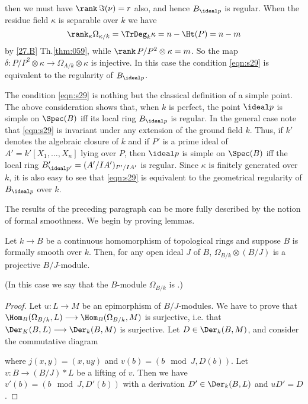 \documentclass[../main]{subfiles}
\begin{document}
then we must have $\rank \, \Im(\nu) = r$ also, and hence $B_{\ideal p}$ is regular. When the residue field $\kappa$ is separable over $k$ we have 
\[
\rank_\kappa \Omega_{\kappa/k} = \TrDeg_k \kappa = n - \Ht(P) = n - m
\]
by \ref{27.B} Th.\ref{thm:059}, while $\rank \, P/P^2 \otimes \kappa = m$. So the map $\delta : P/P^2 \otimes \kappa \longrightarrow \Omega_{A/k} \otimes \kappa$ is injective. In this case the condition \eqref{eqn:s29} is equivalent to the regularity of $B_{\ideal p}$. 

The condition \eqref{eqn:s29} is nothing but the classical definition of a simple point. The above consideration shows that, when $k$ is perfect, the point $\ideal p$ is simple on $\Spec(B)$ iff its local ring $B_{\ideal p}$ is regular. In the general case note that \eqref{eqn:s29} is invariant under any extension of the ground field $k$. Thus, if $k'$ denotes the algebraic closure of $k$ and if $P'$ is a prime ideal of $A' = k'[X_1, \ldots, X_n]$ lying over $P$, then $\ideal p$ is simple on $\Spec(B)$ iff the local ring $B'_{\ideal p'} = (A'/IA')_{P'/IA'}$ is regular. Since $\kappa$ is finitely generated over $k$, it is also easy to see that \eqref{eqn:s29} is equivalent to the geometrical regularity of $B_{\ideal p}$ over $k$. 

\newparagraph The results of the preceding paragraph can be more fully described by the notion of formal smoothness. We begin by proving lemmas. 

\begin{lemma}
\label{lem:29.1}
Let $k \longrightarrow B$ be a continuous homomorphism of topological rings and suppose $B$ is formally smooth over $k$. Then, for any open ideal $J$ of $B$, $\Omega_{B/k} \otimes (B/J)$ is a projective $B/J$-module. 
\end{lemma}

(In this case we say that the $B$-module $\Omega_{B/k}$ is .)

\begin{proof}
Let $u : L \longrightarrow M$ be an epimorphism of $B/J$-modules. We have to prove that $\Hom_B(\Omega_{B/k}, L) \longrightarrow \Hom_B(\Omega_{B/k}, M)$ is surjective, i.e. that $\Der_K(B, L) \longrightarrow \Der_k(B,M)$ is surjective. Let $D \in \Der_k(B,M)$, and consider the commutative diagram

\begin{center}
\end{center}

where $j(x,y) = (x, uy)$ and $v(b) = (b \mod J, D(b))$. Let $v : B \longrightarrow (B/J) \ast L$ be a lifting of $v$. Then we have $v'(b) = (b \mod J, D'(b))$ with a derivation $D' \in \Der_k(B, L)$ and $u D' = D$.
\end{proof}
\end{document}
